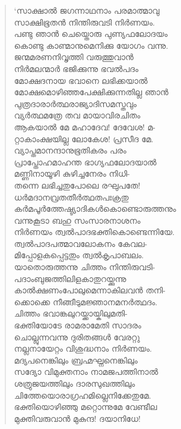 \begin{verse}
‘സാക്ഷാല്‍ ജഗന്നാഥനാം പരമാത്മാവു\\
സാക്ഷിഭൂതന്‍ നിന്തിരുവടി നിര്‍ണയം.\\
പണ്ടു ഞാന്‍ ചെയ്തൊരു പുണ്യഫലോദയം\\
കൊണ്ടു കാണ്മാനുമെനിക്കു യോഗം വന്നു.\\
ജന്മമരണനിവൃത്തി വരുത്തുവാന്‍\\
നിര്‍മലന്മാര്‍ ഭജിക്കുന്നു ഭവല്‍പദം\\
മോക്ഷദനായ ഭവാനെ ലഭിക്കയാല്‍\\
മോക്ഷമൊഴിഞ്ഞപേക്ഷിക്കുന്നതില്ല ഞാന്‍\\
പുത്രദാരാര്‍ത്ഥരാജ്യാദിസമസ്തവും\\
വ്യര്‍ത്ഥമത്രേ തവ മായാവിരചിതം\\
ആകയാല്‍ മേ മഹാദേവ! ദേവേശ! മ-\\
റ്റാകാംക്ഷയില്ല ലോകേശ! പ്രസീദ മേ.\\
വ്യാപ്തമാനന്ദാനുഭൂതികരം പരം\\
പ്രാപ്തോഹമാഹന്ത ഭാഗ്യഫലോദയാല്‍\\
മണ്ണിനായൂഴി കുഴിച്ചനേരം നിധി-\\
തന്നെ ലഭിച്ചതുപോലെ രഘുപതേ!\\
ധര്‍മദാനവ്രതതീര്‍ത്ഥതപഃക്രതു\\
കര്‍മപൂര്‍ത്തേഷ്ട്യാദികള്‍കൊണ്ടൊരുത്തനും\\
വന്നുകൂടാ ബഹു സംസാരനാശനം\\
നിര്‍ണയം ത്വല്‍പാദഭക്തികൊണ്ടെന്നിയേ.\\
ത്വല്‍പാദപത്മാവലോകനം കേവല-\\
മിപ്പോളകപ്പെട്ടതും ത്വല്‍കൃപാബലം.\\
യാതൊരുത്തന്നു ചിത്തം നിന്തിരുവടി-\\
പദാംബുജത്തിലിളകാതുറയ്ക്കുന്നു\\
കാല്‍ക്ഷണംപോലുമെന്നാകിലവന്‍ തനി-\\
ക്കൊക്കെ നീങ്ങീടുമജ്ഞാനമനര്‍ത്ഥദം.\\
ചിത്തം ഭവാങ്കലുറയ്ക്കായ്കിലുമതി-\\
ഭക്തിയോടേ രാമരാമേതി സാദരം\\
ചൊല്ലുന്നവന്നു ദുരിതങ്ങള്‍ വേരറ്റു\\
നല്ലനായേറ്റം വിശുദ്ധനാം നിര്‍ണയം.\\
മദ്യപനെങ്കിലും ബ്രഹ്മഘ്നനെങ്കിലും\\
സദ്യോ വിമുക്തനാം നാമജപത്തിനാല്‍\\
ശത്രുജയത്തിലും ദാരസുഖത്തിലും\\
ചിത്തേയൊരാഗ്രഹമില്ലെനിക്കേതുമേ.\\
ഭക്തിയൊഴിഞ്ഞു മറ്റൊന്നുമേ വേണ്ടീല\\
മുക്തിവരുവാന്‍ മുകുന്ദ! ദയാനിധേ!\\

\end{verse}
